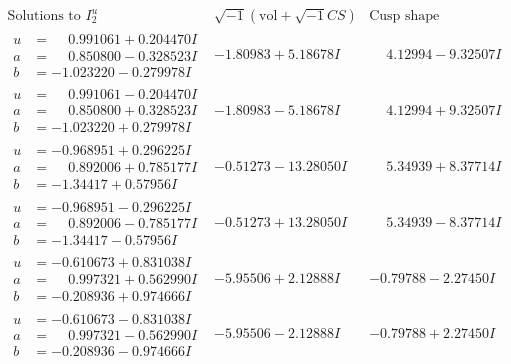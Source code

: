 \documentclass[1p]{elsarticle_modified}
\theoremstyle{definition}
\newcommand{\I}{\sqrt{-1}}
\begin{document}
$$\begin{array}{c|c|c}  
\text{Solutions to }I^u_{2}& \I (\text{vol} + \sqrt{-1}CS) & \text{Cusp shape}\\
 \hline 
\begin{aligned}
u &= \phantom{-}0.991061 + 0.204470 I \\
a &= \phantom{-}0.850800 - 0.328523 I \\
b &= -1.023220 - 0.279978 I\end{aligned}
 & -1.80983 + 5.18678 I & \phantom{-}4.12994 - 9.32507 I \\ \hline\begin{aligned}
u &= \phantom{-}0.991061 - 0.204470 I \\
a &= \phantom{-}0.850800 + 0.328523 I \\
b &= -1.023220 + 0.279978 I\end{aligned}
 & -1.80983 - 5.18678 I & \phantom{-}4.12994 + 9.32507 I \\ \hline\begin{aligned}
u &= -0.968951 + 0.296225 I \\
a &= \phantom{-}0.892006 + 0.785177 I \\
b &= -1.34417 + 0.57956 I\end{aligned}
 & -0.51273 - 13.28050 I & \phantom{-}5.34939 + 8.37714 I \\ \hline\begin{aligned}
u &= -0.968951 - 0.296225 I \\
a &= \phantom{-}0.892006 - 0.785177 I \\
b &= -1.34417 - 0.57956 I\end{aligned}
 & -0.51273 + 13.28050 I & \phantom{-}5.34939 - 8.37714 I \\ \hline\begin{aligned}
u &= -0.610673 + 0.831038 I \\
a &= \phantom{-}0.997321 + 0.562990 I \\
b &= -0.208936 + 0.974666 I\end{aligned}
 & -5.95506 + 2.12888 I & -0.79788 - 2.27450 I \\ \hline\begin{aligned}
u &= -0.610673 - 0.831038 I \\
a &= \phantom{-}0.997321 - 0.562990 I \\
b &= -0.208936 - 0.974666 I\end{aligned}
 & -5.95506 - 2.12888 I & -0.79788 + 2.27450 I \\ \hline\begin{aligned}

\end{aligned}
\end{array}$$
\end{document}
